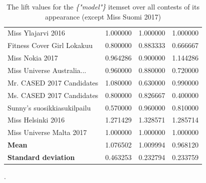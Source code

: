 \documentclass[english]{tktltiki}
\begin{document}
\begin{table}
\begin{adjustbox}{width=1\textwidth}
\begin{tabular}{lccc}
                                Miss Ylajarvi 2016 &  1.000000 &  1.000000 &    1.000000 \\
                        Fitness Cover Girl Lokakuu &  0.800000 &  0.883333 &    0.666667 \\
                                   Miss Nokia 2017 &  0.964286 &  0.900000 &    1.144286 \\
                        Miss Universe Australia... &  0.960000 &  0.880000 &    0.720000 \\
                         Mr. CASED 2017 Candidates &  1.080000 &  0.630000 &    0.990000 \\
                         Ms. CASED 2017 Candidates &  0.800000 &  0.826667 &    0.400000 \\
                       Sunny's suosikkiasukilpailu &  0.570000 &  0.960000 &    0.810000 \\
                                Miss Helsinki 2016 &  1.271429 &  1.328571 &    1.285714 \\
                          Miss Universe Malta 2017 &  1.000000 &  1.000000 &    1.000000 \\
        \bottomrule
        \textbf{Mean} & 1.076502 & 1.009994 & 0.968120 \\
        \textbf{Standard deviation} & 0.463253 & 0.232794 & 0.233759
    \end{tabular}
    \end{adjustbox}
    \caption{The lift values for the \emph{\{"model"\}} itemset over all contests of its appearance (except Miss Suomi 2017)}.
    \label{model_itemset_lift_observations}
\end{table}
\end{document}
